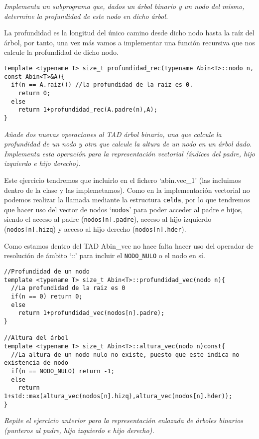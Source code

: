\textbf{\large{}}\textit{ Implementa un subprograma que, dados un árbol binario y un nodo del mismo, determine la profundidad de este nodo en dicho árbol.}

La profundidad es la longitud del único camino desde dicho nodo hasta la raíz del árbol, por tanto, una vez más vamos a implementar una función recursiva que nos calcule la profundidad de dicho nodo.
\begin{verbatim}
template <typename T> size_t profundidad_rec(typename Abin<T>::nodo n, const Abin<T>&A){
  if(n == A.raiz()) //la profundidad de la raiz es 0.
    return 0;
  else
    return 1+profundidad_rec(A.padre(n),A);
}
\end{verbatim}

\textbf{\large{}}\textit{ Añade dos nuevas operaciones al TAD árbol binario, una que calcule la profundidad de un nodo y otra que calcule la altura de un nodo en un árbol dado. Implementa esta operación para la representación vectorial (índices del padre, hijo izquierdo e hijo derecho).}

Este ejercicio tendremos que incluirlo en el fichero `abin.vec\_1' (las incluimos dentro de la clase y las implemetamos). Como en la implementación vectorial no podemos realizar la llamada mediante la estructura \texttt{celda}, por lo que tendremos que hacer uso del vector de nodos `\texttt{nodos}' para poder acceder al padre e hijos, siendo el acceso al padre (\texttt{nodos[n].padre}), acceso al hijo izquierdo (\texttt{nodos[n].hizq}) y acceso al hijo derecho (\texttt{nodos[n].hder}).

Como estamos dentro del TAD Abin\_vec no hace falta hacer uso del operador de resolución de ámbito `::' para incluir el \texttt{NODO\_NULO} o el nodo en sí.
\begin{verbatim}
//Profundidad de un nodo
template <typename T> size_t Abin<T>::profundidad_vec(nodo n){
  //La profundidad de la raiz es 0
  if(n == 0) return 0;
  else
    return 1+profundidad_vec(nodos[n].padre);
}

//Altura del árbol
template <typename T> size_t Abin<T>::altura_vec(nodo n)const{
  //La altura de un nodo nulo no existe, puesto que este indica no existencia de nodo
  if(n == NODO_NULO) return -1;
  else
    return 1+std::max(altura_vec(nodos[n].hizq),altura_vec(nodos[n].hder));
}
\end{verbatim}

\textbf{\large{}}\textit{ Repite el ejercicio anterior para la representación enlazada de árboles binarios (punteros al padre, hijo izquierdo e hijo derecho).}


